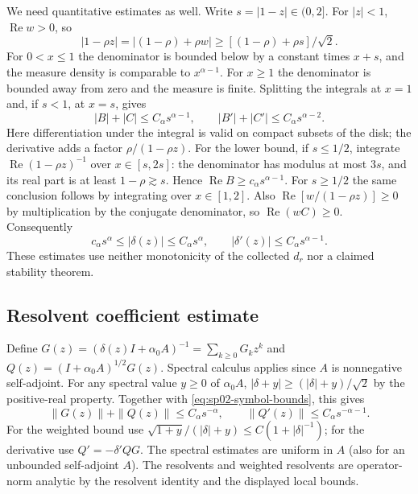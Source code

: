\documentclass[11pt,a4paper]{amsart}
\theoremstyle{remark}
\theoremstyle{plain}
\theoremstyle{remark}
\numberwithin{equation}{section}
\begin{document}
We need quantitative estimates as well. Write $s=|1-z|\in(0,2]$. For $|z|<1$, $\operatorname{Re}w>0$, so
\[
 |1-\rho z|=|(1-\rho)+\rho w|\ge [(1-\rho)+\rho s]/\sqrt2.
\]
For $0<x\le1$ the denominator is bounded below by a constant times $x+s$, and the measure density is comparable to $x^{\alpha-1}$. For $x\ge1$ the denominator is bounded away from zero and the measure is finite. Splitting the integrals at $x=1$ and, if $s<1$, at $x=s$, gives
\[
 |B|+|C|\le C_\alpha s^{\alpha-1},\qquad
 |B'|+|C'|\le C_\alpha s^{\alpha-2}.
\]
Here differentiation under the integral is valid on compact subsets of the disk; the derivative adds a factor $\rho/(1-\rho z)$. For the lower bound, if $s\le1/2$, integrate $\operatorname{Re}(1-\rho z)^{-1}$ over $x\in[s,2s]$: the denominator has modulus at most $3s$, and its real part is at least $1-\rho\gtrsim s$. Hence $\operatorname{Re}B\ge c_\alpha s^{\alpha-1}$. For $s\ge1/2$ the same conclusion follows by integrating over $x\in[1,2]$. Also $\operatorname{Re}[w/(1-\rho z)]\ge0$ by multiplication by the conjugate denominator, so $\operatorname{Re}(wC)\ge0$. Consequently
\begin{equation}\label{eq:sp02-symbol-bounds}
 c_\alpha s^\alpha\le|\delta(z)|\le C_\alpha s^\alpha,\qquad
 |\delta'(z)|\le C_\alpha s^{\alpha-1}.
\end{equation}
These estimates use neither monotonicity of the collected $d_r$ nor a claimed stability theorem.

\subsection{Resolvent coefficient estimate}
Define $G(z)=(\delta(z)I+\alpha_0 A)^{-1}=\sum_{k\ge0}G_kz^k$ and $Q(z)=(I+\alpha_0 A)^{1/2}G(z)$. Spectral calculus applies since $A$ is nonnegative self-adjoint. For any spectral value $y\ge0$ of $\alpha_0 A$, $|\delta+y|\ge(|\delta|+y)/\sqrt2$ by the positive-real property. Together with \eqref{eq:sp02-symbol-bounds}, this gives
\[
 \|G(z)\|+\|Q(z)\|\le C_\alpha s^{-\alpha},\qquad
 \|Q'(z)\|\le C_\alpha s^{-\alpha-1}.
\]
For the weighted bound use $\sqrt{1+y}/(|\delta|+y)\le C(1+|\delta|^{-1})$; for the derivative use $Q'=-\delta' QG$. The spectral estimates are uniform in $A$ (also for an unbounded self-adjoint $A$). The resolvents and weighted resolvents are operator-norm analytic by the resolvent identity and the displayed local bounds.
\end{document}
